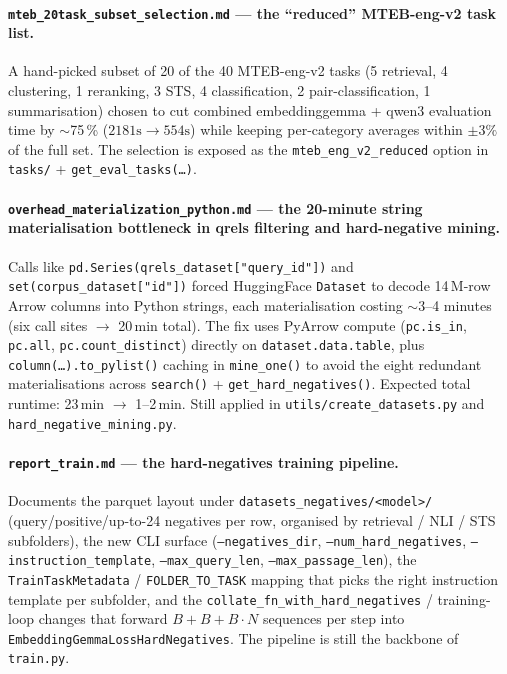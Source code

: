 \documentclass{article}
\begin{document}
\paragraph{\texttt{mteb\_20task\_subset\_selection.md} --- the
``reduced'' MTEB-eng-v2 task list.} A hand-picked subset of 20 of the
40 MTEB-eng-v2 tasks (5 retrieval, 4 clustering, 1 reranking, 3 STS,
4 classification, 2 pair-classification, 1 summarisation) chosen to
cut combined embeddinggemma + qwen3 evaluation time by $\sim$75\,\%
($2181\text{s} \to 554\text{s}$) while keeping per-category averages
within $\pm 3\%$ of the full set. The selection is exposed as the
\texttt{mteb\_eng\_v2\_reduced} option in \texttt{tasks/} +
\texttt{get\_eval\_tasks(\dots)}.

\paragraph{\texttt{overhead\_materialization\_python.md} --- the
20-minute string materialisation bottleneck in qrels filtering and
hard-negative mining.} Calls like
\texttt{pd.Series(qrels\_dataset["query\_id"])} and
\texttt{set(corpus\_dataset["id"])} forced HuggingFace
\texttt{Dataset} to decode 14\,M-row Arrow columns into Python
strings, each materialisation costing $\sim$3--4 minutes (six call
sites $\to$ 20\,min total). The fix uses PyArrow compute
(\texttt{pc.is\_in}, \texttt{pc.all}, \texttt{pc.count\_distinct})
directly on \texttt{dataset.data.table}, plus
\texttt{column(\dots).to\_pylist()} caching in \texttt{mine\_one()}
to avoid the eight redundant materialisations across
\texttt{search()} + \texttt{get\_hard\_negatives()}. Expected total
runtime: 23\,min $\to$ 1--2\,min. Still applied in
\texttt{utils/create\_datasets.py} and
\texttt{hard\_negative\_mining.py}.

\paragraph{\texttt{report\_train.md} --- the hard-negatives training
pipeline.} Documents the parquet layout under
\texttt{datasets\_negatives/<model>/} (query/positive/up-to-24
negatives per row, organised by retrieval / NLI / STS subfolders),
the new CLI surface (\texttt{--negatives\_dir},
\texttt{--num\_hard\_negatives}, \texttt{--instruction\_template},
\texttt{--max\_query\_len}, \texttt{--max\_passage\_len}), the
\texttt{TrainTaskMetadata} / \texttt{FOLDER\_TO\_TASK} mapping that
picks the right instruction template per subfolder, and the
\texttt{collate\_fn\_with\_hard\_negatives} / training-loop changes
that forward $B + B + B\!\cdot\! N$ sequences per step into
\texttt{EmbeddingGemmaLossHardNegatives}. The pipeline is still the
backbone of \texttt{train.py}.
\end{document}
